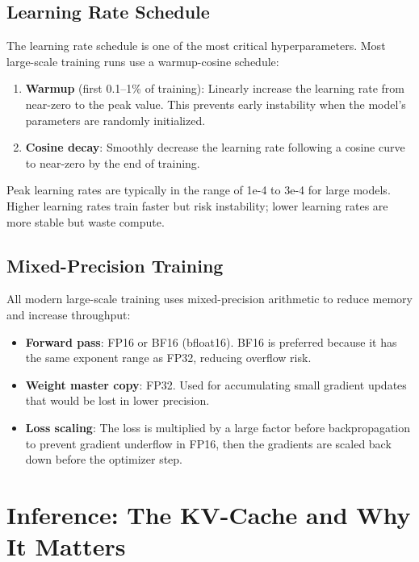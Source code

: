 \subsection{Learning Rate Schedule}

The learning rate schedule is one of the most critical hyperparameters. Most large-scale training runs use a warmup-cosine schedule:

\begin{enumerate}[leftmargin=*]
    \item \textbf{Warmup} (first 0.1--1\% of training): Linearly increase the learning rate from near-zero to the peak value. This prevents early instability when the model's parameters are randomly initialized.
    \item \textbf{Cosine decay}: Smoothly decrease the learning rate following a cosine curve to near-zero by the end of training.
\end{enumerate}

Peak learning rates are typically in the range of 1e-4 to 3e-4 for large models. Higher learning rates train faster but risk instability; lower learning rates are more stable but waste compute.

\subsection{Mixed-Precision Training}

All modern large-scale training uses mixed-precision arithmetic to reduce memory and increase throughput:

\begin{itemize}[leftmargin=*]
    \item \textbf{Forward pass}: FP16 or BF16 (bfloat16). BF16 is preferred because it has the same exponent range as FP32, reducing overflow risk.
    \item \textbf{Weight master copy}: FP32. Used for accumulating small gradient updates that would be lost in lower precision.
    \item \textbf{Loss scaling}: The loss is multiplied by a large factor before backpropagation to prevent gradient underflow in FP16, then the gradients are scaled back down before the optimizer step.
\end{itemize}

\section{Inference: The KV-Cache and Why It Matters}
\label{sec:kv-cache}

